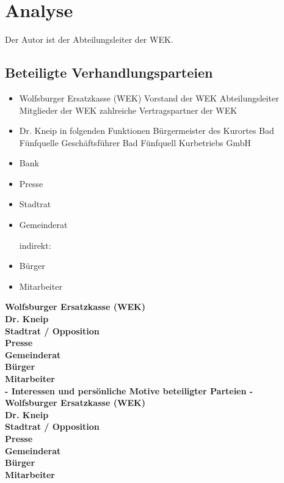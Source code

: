 \chapter{Analyse}
Der Autor ist der Abteilungsleiter der WEK.
\section{Beteiligte Verhandlungsparteien}
\begin{itemize}
	\item Wolfsburger Ersatzkasse (WEK)
    	\subitem Vorstand der WEK
    	\subitem Abteilungsleiter
		\subitem Mitglieder der WEK
		\subitem zahlreiche Vertragspartner der WEK
    
	\item Dr. Kneip in folgenden Funktionen
		\subitem Bürgermeister des Kurortes Bad Fünfquelle
		\subitem Geschäftsführer Bad Fünfquell Kurbetriebs GmbH
    
    \item Bank
    \item Presse
    \item Stadtrat
	\item Gemeinderat 
    
    indirekt:
	\item Bürger	
	\item Mitarbeiter
\end{itemize}

\smallskip \textbf{Wolfsburger Ersatzkasse (WEK)} \\
\smallskip \textbf{Dr. Kneip} \\
\smallskip \textbf{Stadtrat / Opposition} \\
\smallskip \textbf{Presse} \\
\smallskip \textbf{Gemeinderat} \\
\smallskip \textbf{Bürger} \\
\smallskip \textbf{Mitarbeiter} \\

\smallskip \textbf{- Interessen und persönliche Motive beteiligter Parteien -} \\
\smallskip \textbf{Wolfsburger Ersatzkasse (WEK)} \\
\smallskip \textbf{Dr. Kneip} \\
\smallskip \textbf{Stadtrat / Opposition} \\
\smallskip \textbf{Presse} \\
\smallskip \textbf{Gemeinderat} \\
\smallskip \textbf{Bürger} \\
\smallskip \textbf{Mitarbeiter} \\

